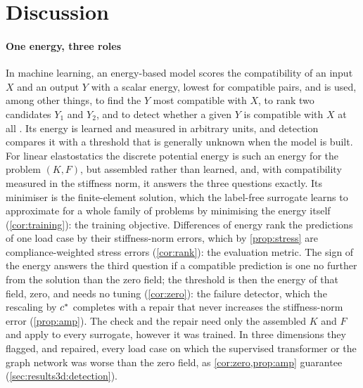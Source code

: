 \section{Discussion}\label{sec:discussion}

\paragraph{One energy, three roles}
In machine learning, an energy-based model scores the compatibility of an input $X$ and an
output $Y$ with a scalar energy, lowest for compatible pairs, and is used, among other
things, to find the $Y$ most compatible with $X$, to rank two candidates $Y_1$ and $Y_2$,
and to detect whether a given $Y$ is compatible with $X$ at all \cite{LeCun2007EBM}. Its
energy is learned and measured in arbitrary units, and detection compares it with a
threshold that is generally unknown when the model is built. For linear elastostatics the
discrete potential energy is such an energy for the problem $(K,F)$, but assembled rather
than learned, and, with compatibility measured in the stiffness norm, it answers the three
questions exactly. Its minimiser is the finite-element solution, which the label-free
surrogate learns to approximate for a whole family of problems by minimising the energy
itself (\cref{cor:training}): the training objective. Differences of energy rank the
predictions of one load case by their stiffness-norm errors, which by \cref{prop:stress}
are compliance-weighted stress errors (\cref{cor:rank}): the evaluation metric. The sign of
the energy answers the third question if a compatible prediction is one no further from the
solution than the zero field; the threshold is then the energy of that field, zero, and
needs no tuning (\cref{cor:zero}): the failure detector, which the rescaling by $c^{\ast}$
completes with a repair that never increases the stiffness-norm error (\cref{prop:amp}).
The check and the repair need only the assembled $K$ and $F$ and apply to every surrogate,
however it was trained. In three dimensions they flagged, and repaired, every load case on
which the supervised transformer or the graph network was worse than the zero field, as
\cref{cor:zero,prop:amp} guarantee (\cref{sec:results3d:detection}).

